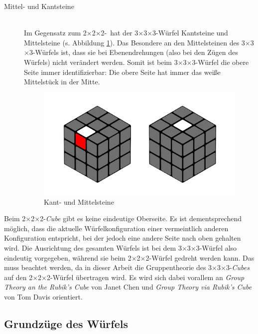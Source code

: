 \documentclass[12pt,a4paper, usenames, dvipsnames]{article}
\theoremstyle{mystyle}
\theoremstyle{definition}
\newcommand{\Ttwo}{2$\times$2$\times$2-}
\newcommand{\Tthree}{3$\times$3$\times$3-}
\begin{document}
\begin{description}
\newpage
\item[Mittel- und Kantsteine] \ \\
Im Gegensatz zum \Ttwo \ hat der \Tthree Würfel Kantsteine und Mittelsteine (s. Abbildung \ref{Abbildung_MittelKantSteine}).
Das Besondere an den Mittelsteinen des \Tthree Würfels ist, dass sie bei Ebenendrehungen (also bei den Zügen des Würfels) nicht verändert werden. Somit ist beim \Tthree Würfel die obere Seite immer identifizierbar: Die obere Seite hat immer das weiße Mittelstück in der Mitte. 
\begin{figure}[H]
\centering
\includegraphics[scale=0.11]{mittelkant.png}
\caption[Kant- und Mittelsteine]{Kant- und Mittelsteine}
\label{Abbildung_MittelKantSteine}
\end{figure}



\end{description}

Beim \Ttwo \textit{Cube} gibt es keine eindeutige Oberseite. Es ist dementsprechend möglich, dass die aktuelle Würfelkonfiguration einer vermeintlich anderen Konfiguration entspricht, bei der jedoch eine andere Seite nach oben gehalten wird.
Die Ausrichtung des gesamten Würfels ist bei dem \Tthree Würfel also eindeutig vorgegeben, während sie beim \Ttwo Würfel gedreht werden kann.  
Das muss beachtet werden, da in dieser Arbeit die Gruppentheorie des \Tthree \textit{Cubes} auf den \Ttwo Würfel übertragen wird. Es wird sich dabei vorallem an \textit{Group Theory an the Rubik's Cube} von Janet Chen \cite{JC} und \textit{Group Theory via Rubik's Cube} von Tom Davis \cite{TD} orientiert.

%
%
%
%
%
%
%
%
%
%
%
%
%


\subsection{Grundzüge des Würfels} 
\end{document}
